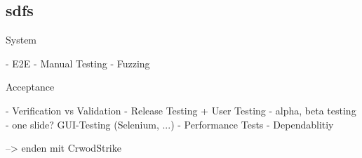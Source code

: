 \subsection{sdfs}
\begin{frame}
	System 
	
	- E2E
	- Manual Testing
	- Fuzzing
	
	Acceptance 
	
	- Verification vs Validation
	- Release Testing + User Testing
	- alpha, beta testing
	- one slide? GUI-Testing (Selenium, ...)
	- Performance Tests
	- Dependablitiy
	
	--> enden mit CrwodStrike
\end{frame}